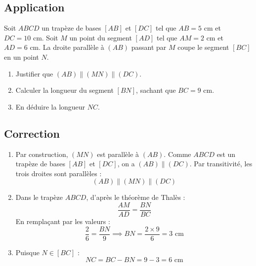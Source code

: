 \documentclass[12pt,a4paper]{article}
\begin{document}
\begin{center}
\end{center}
\subsection*{\color{myred}Application}
Soit $ABCD$ un trapèze de bases $[AB]$ et $[DC]$ tel que $AB = 5\text{ cm}$ et $DC = 10\text{ cm}$. 
Soit $M$ un point du segment $[AD]$ tel que $AM = 2\text{ cm}$ et $AD = 6\text{ cm}$.
La droite parallèle à $(AB)$ passant par $M$ coupe le segment $[BC]$ en un point $N$.

\begin{enumerate}
    \item Justifier que $(AB) \parallel (MN) \parallel (DC)$.
    \item Calculer la longueur du segment $[BN]$, sachant que $BC = 9\text{ cm}$.
    \item En déduire la longueur $NC$.
\end{enumerate}

\subsection*{\color{myred}Correction}
\begin{enumerate}
    \item Par construction, $(MN)$ est parallèle à $(AB)$. Comme $ABCD$ est un trapèze de bases $[AB]$ et $[DC]$, on a $(AB) \parallel (DC)$. Par transitivité, les trois droites sont parallèles : 
    \[(AB) \parallel (MN) \parallel (DC)\]
    
    \item Dans le trapèze $ABCD$, d'après le théorème de Thalès :
    \[\dfrac{AM}{AD} = \dfrac{BN}{BC}\]
    En remplaçant par les valeurs :
    \[\dfrac{2}{6} = \dfrac{BN}{9} \implies BN = \dfrac{2 \times 9}{6} = 3\text{ cm}\]
    
    \item Puisque $N \in [BC]$ :
    \[NC = BC - BN = 9 - 3 = 6\text{ cm}\]
\end{enumerate}
\end{document}
